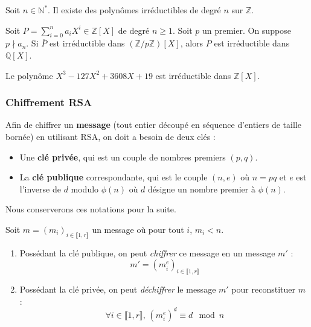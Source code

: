 
	\begin{application}
		Soit $n \in \mathbb{N}^*$. Il existe des polynômes irréductibles de degré $n$ sur $\mathbb{Z}$.
	\end{application}


	\begin{theorem}
		Soit $P = \sum_{i=0}^n a_i X^i \in \mathbb{Z}[X]$ de degré $n \geq 1$. Soit $p$ un premier. On suppose $p \nmid a_n$.
		\newpar
		Si $\overline{P}$ est irréductible dans $(\mathbb{Z}/p\mathbb{Z})[X]$, alors $P$ est irréductible dans $\mathbb{Q}[X]$.
	\end{theorem}

	\begin{example}
		Le polynôme $X^3-127X^2+3608X+19$ est irréductible dans $\mathbb{Z}[X]$.
	\end{example}

	\subsubsection{Chiffrement RSA}


	\begin{definition}
		Afin de chiffrer un \textbf{message} (tout entier découpé en séquence d'entiers de taille bornée) en utilisant RSA, on doit a besoin de deux clés :
		\begin{itemize}
			\item Une \textbf{clé privée}, qui est un couple de nombres premiers $(p,q)$.
			\item La \textbf{clé publique} correspondante, qui est le couple $(n,e)$ où $n = pq$ et $e$ est l'inverse de $d$ modulo $\phi(n)$ où $d$ désigne un nombre premier à $\phi(n)$.
		\end{itemize}
	\end{definition}

	Nous conserverons ces notations pour la suite.

	\begin{theorem}
		Soit $m = (m_i)_{i \in \llbracket 1, r \rrbracket}$ un message où pour tout $i$, $m_i < n$.
		\begin{enumerate}[label=(\roman*)]
			\item Possédant la clé publique, on peut \textit{chiffrer} ce message en un message $m'$ :
			\[ m' = (m_i^e)_{i \in \llbracket 1, r \rrbracket} \]
			\item Possédant la clé privée, on peut \textit{déchiffrer} le message $m'$ pour reconstituer $m$ :
			\[ \forall i \in \llbracket 1, r \rrbracket, \, (m_i^e)^d \equiv d \mod n \]
		\end{enumerate}
	\end{theorem}

